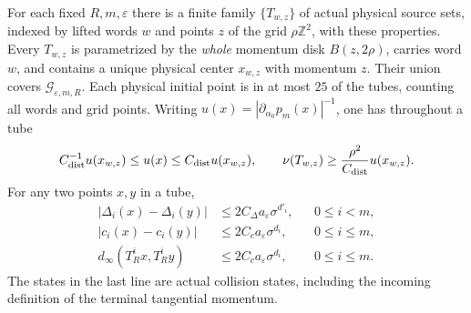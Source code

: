 \begin{lemma}
\label{lem:at-cover}
For each fixed $R,m,\varepsilon$ there is a finite family
$\{T_{w,z}\}$ of actual physical source sets, indexed by lifted
words $w$ and points $z$ of the grid $\rho\mathbb Z^2$, with
these properties.
Every $T_{w,z}$ is parametrized by the \emph{whole} momentum disk
$B(z,2\rho)$, carries word $w$, and contains a unique physical
center $x_{w,z}$ with momentum $z$.  Their union covers
$\mathcal G_{\varepsilon,m,R}$.  Each physical initial point is
in at most $25$ of the tubes, counting all words and grid points.
Writing
$u(x)=|\partial_{\alpha_0}p_m(x)|^{-1}$, one has throughout a tube
\begin{equation}\label{eq:at-weight}
 C_{\rm dist}^{-1}u(x_{w,z})\le u(x)\le
 C_{\rm dist}u(x_{w,z}),\qquad
 \nu(T_{w,z})\ge\frac{\rho^2}{C_{\rm dist}}u(x_{w,z}).
\end{equation}
For any two points $x,y$ in a tube,
\begin{align}
 |\Delta_i(x)-\Delta_i(y)|
     &\le2C_\Delta a_\varepsilon\sigma^{d'_i},
                                   &&0\le i<m,\label{eq:at-clearance}\\
 |c_i(x)-c_i(y)|
     &\le2C_c a_\varepsilon\sigma^{d_i},
                                   &&0\le i\le m,\label{eq:at-incidence}\\
 d_\infty(T_R^ix,T_R^iy)
     &\le2C_c a_\varepsilon\sigma^{d_i},
                                   &&0\le i\le m.\label{eq:at-state}
\end{align}
The states in the last line are actual collision states, including
the incoming definition of the terminal tangential momentum.
\end{lemma}
